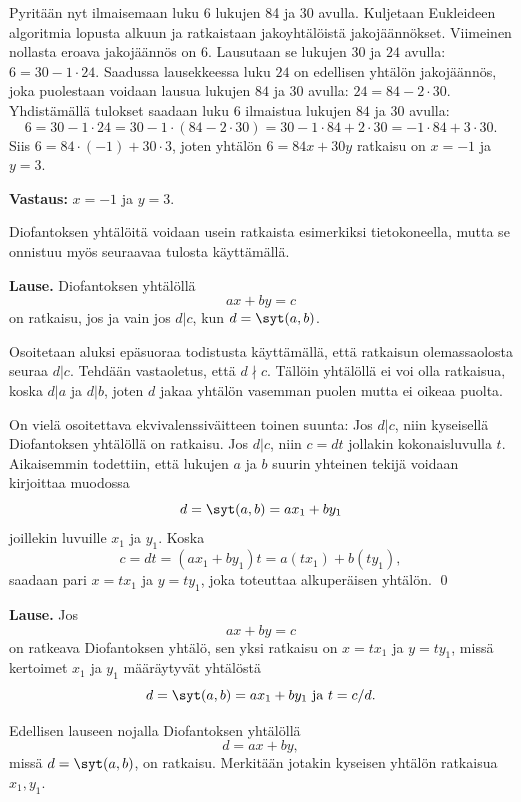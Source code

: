 Pyritään nyt ilmaisemaan luku 6 lukujen 84 ja 30 avulla.
Kuljetaan Eukleideen algoritmia lopusta alkuun ja
ratkaistaan jakoyhtälöistä jakojäännökset. Viimeinen
nollasta eroava jakojäännös on $6$. Lausutaan se lukujen
$30$ ja $24$ avulla: $6 = 30 - 1 \cdot 24$. Saadussa
lausekkeessa luku $24$ on edellisen yhtälön jakojäännös,
joka puolestaan voidaan lausua lukujen $84$ ja $30$
avulla: $24 = 84 - 2 \cdot 30$. Yhdistämällä tulokset
saadaan luku $6$ ilmaistua lukujen $84$ ja $30$ avulla:
\[
6 = 30 - 1 \cdot 24 = 30 - 1 \cdot (84 - 2 \cdot 30) = 30
- 1 \cdot 84 + 2 \cdot 30 = -1 \cdot 84 + 3 \cdot 30.
\]
Siis $6 = 84 \cdot (-1) + 30 \cdot 3$, joten yhtälön $6=84x+30y$
ratkaisu on $x = -1$ ja $y = 3$.

{\bf Vastaus:} $x = -1$ ja $y = 3$.

Diofantoksen yhtälöitä voidaan usein ratkaista esimerkiksi tietokoneella, mutta se onnistuu myös seuraavaa tulosta käyttämällä.

{\bf Lause.} Diofantoksen yhtälöllä
\[
a x + b y = c
\]
on ratkaisu, jos ja vain jos $d|c$, kun $d=\syt(a,b)$.

\proof

Osoitetaan aluksi epäsuoraa todistusta käyttämällä, että ratkaisun olemassaolosta seuraa $d|c$. Tehdään vastaoletus, että $d \nmid c$. Tällöin yhtälöllä ei voi olla ratkaisua, koska $d|a$ ja $d|b$, joten $d$ jakaa yhtälön vasemman puolen mutta ei oikeaa puolta.

On vielä osoitettava ekvivalenssiväitteen toinen suunta: Jos $d|c$, niin kyseisellä Diofantoksen yhtälöllä on ratkaisu. Jos $d|c$, niin $c=dt$ jollakin kokonaisluvulla $t$. Aikaisemmin todettiin, että lukujen $a$ ja $b$ suurin yhteinen tekijä voidaan kirjoittaa muodossa
\[
d=\syt(a,b)=a x_1 + b y_1
\]
joillekin luvuille $x_1$ ja $y_1$. Koska
\[
c = dt = (ax_1 + by_1)t = a(tx_1)+ b(ty_1),
\]
saadaan pari $x=tx_1$ ja $y=ty_1$, joka toteuttaa alkuperäisen yhtälön.
\qed

{\bf Lause.}
Jos
\[
a x + b y = c
\]
on ratkeava Diofantoksen yhtälö, sen yksi ratkaisu on $x=tx_1$ ja $y=ty_1$, missä kertoimet $x_1$ ja $y_1$ määräytyvät yhtälöstä
\[
d=\syt(a,b)=a x_1 + b y_1 \textrm{ ja } t=c/d.
\]

\proof
Edellisen lauseen nojalla Diofantoksen yhtälöllä
\[
d= a x + b y,
\]
missä $d=\syt(a,b)$, on ratkaisu. Merkitään jotakin kyseisen yhtälön ratkaisua $x_1,y_1$.

